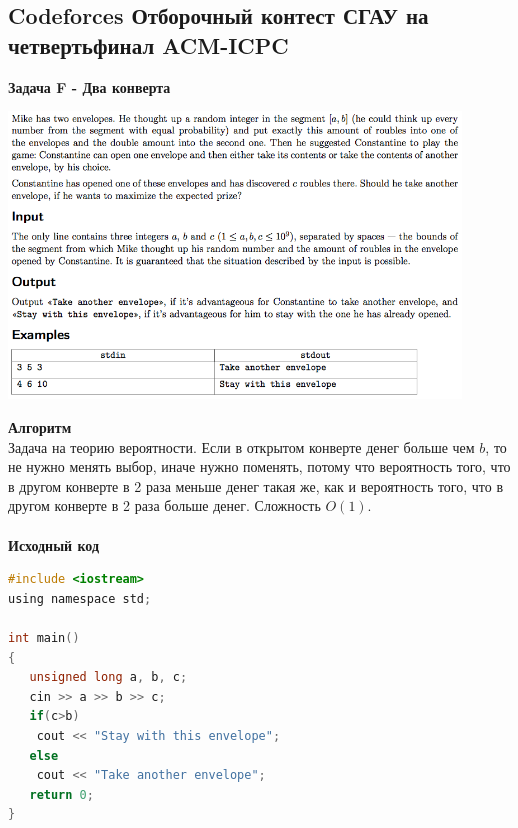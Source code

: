 \documentclass[a4paper,12pt]{article}
\begin{document}
%
%

\newpage
\subsection{Codeforces Отборочный контест СГАУ на четвертьфинал ACM-ICPC}

\textbf{{\large Задача F - Два конверта}} \\
\begin{center}
\includegraphics[width=0.9\textwidth]{CT_SGAU/CT_SGAU_F.png}\\ [1cm]
\end{center}
\textbf{{\large Алгоритм}} \\
Задача на теорию вероятности. Если в открытом конверте денег больше чем $b$, то не нужно менять выбор, иначе нужно поменять, потому что вероятность того, что в другом конверте в 2 раза меньше денег такая же, как и вероятность того, что в другом конверте в 2 раза больше денег. Сложность $O(1)$.\\ 
\\
\textbf{{\large Исходный код}}
\begin{lstlisting}[language=C]
#include <iostream>
using namespace std;

int main()
{
   unsigned long a, b, c;
   cin >> a >> b >> c;
   if(c>b)
	cout << "Stay with this envelope";
   else
	cout << "Take another envelope";
   return 0;
}
\end{lstlisting}
\end{document}
